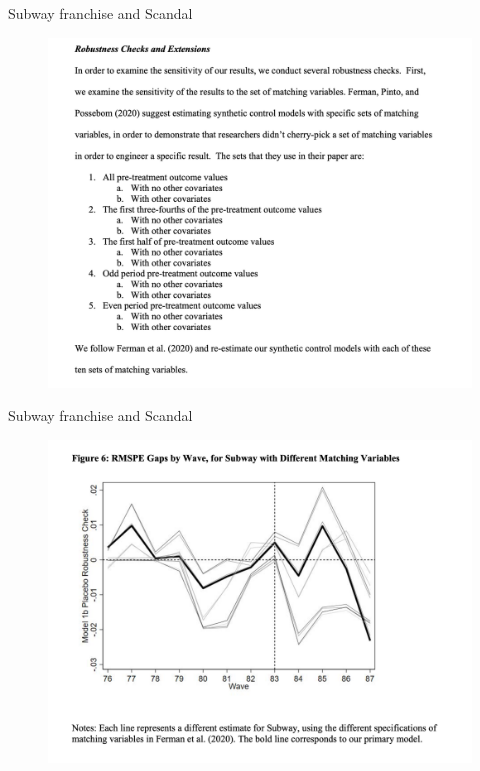 \documentclass{beamer}
\begin{document}
\begin{frame}{Subway franchise and Scandal}

	\begin{figure}
	\includegraphics[scale=0.25]{./lecture_includes/subway_robustness.png}
	\end{figure}

\end{frame}


\begin{frame}{Subway franchise and Scandal}

	\begin{figure}
	\includegraphics[scale=0.25]{./lecture_includes/subway_7.png}
	\end{figure}

\end{frame}
\end{document}
